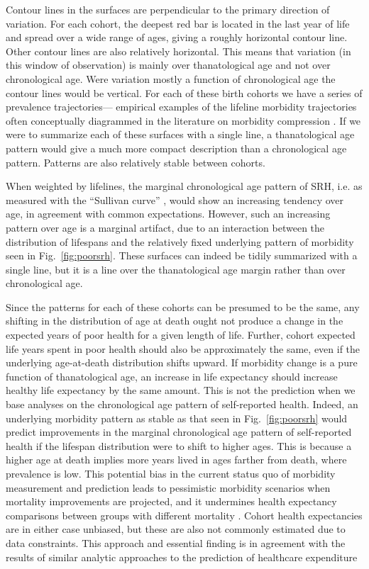 \documentclass[12pt,oneside,a4paper]{article} %
\theoremstyle{definition}
\begin{document}
 Contour lines in the surfaces are perpendicular to the primary direction of
 variation.
 For each cohort, the deepest red bar is located in the last
 year of life and spread over a wide range of ages, giving a roughly horizontal contour line.
Other contour lines are also relatively horizontal. This means that variation
(in this window of observation) is mainly over thanatological age and not over
chronological age. Were variation mostly a function of chronological age the
contour lines would be vertical. For each of these birth cohorts we have a series of prevalence trajectories---
empirical examples of the lifeline morbidity trajectories often conceptually
diagrammed in the literature on morbidity compression
\citep[e.g.,][]{fries2005frailty}. If we were to summarize each of
these surfaces with a single line, a thanatological age pattern would give a
much more compact description than a chronological age pattern. Patterns are
also relatively stable between cohorts.

When weighted by lifelines, the marginal chronological age pattern of SRH,
i.e. as measured with the ``Sullivan curve'' \citep{Sullivan1970}, would show an
increasing tendency over age, in agreement with common expectations.
However, such an increasing pattern over age is a marginal artifact, due to an
interaction between the distribution of lifespans and the relatively fixed underlying
pattern of morbidity seen in Fig.~\ref{fig:poorsrh}. These surfaces can indeed
be tidily summarized with a single line, but it is a line over the
thanatological age margin rather than over chronological age. 

Since the patterns for each of these cohorts can be presumed to be the same, any
shifting in the distribution of age at death ought not produce a change in the
expected years of poor health for a given length of life. Further, cohort
expected life years spent in poor health should also be approximately the same,
even if the underlying age-at-death distribution shifts upward. If morbidity
change is a pure function of thanatological age, an increase in life expectancy
should increase healthy life expectancy by the same amount. This is not the
prediction when we base analyses on the chronological age pattern of
self-reported health. Indeed, an underlying morbidity pattern as stable as
that seen in Fig.~\ref{fig:poorsrh} would predict improvements in the marginal
chronological age pattern of self-reported health if the lifespan distribution
were to shift to higher ages. This is because a higher age at death implies
more years lived in ages farther from death, where prevalence is low.
This potential bias in the current status quo of morbidity measurement and
prediction leads to pessimistic morbidity scenarios when mortality improvements
are projected, and it undermines health expectancy comparisons between groups
with different mortality \citep{vanRaalte2015HLE}.
Cohort health expectancies are in either case unbiased, but these are also not
commonly estimated due to data constraints. This approach and essential finding
is in agreement with the results of similar analytic approaches to the
prediction of healthcare expenditure
\citep[e.g.,][]{miller2001increasing,Geue2014}
\end{document}
